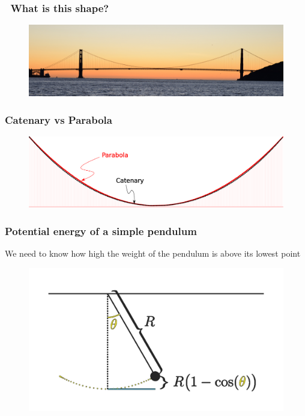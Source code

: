 \documentclass[notes]{beamer}
\begin{document}
\begin{frame}
	\frametitle{\faQuestionCircleO ~What is this shape?}
	\begin{figure}[ht]
		\centering
		\includegraphics[width=\textwidth]{figs/parabola.jpg}
	\end{figure}
\end{frame}


\begin{frame}
	\frametitle{Catenary vs Parabola}
	\begin{figure}[ht]
		\centering
		\includegraphics[width=\textwidth]{figs/catenary_parabola.png}
	\end{figure}
\end{frame}


\begin{frame}
	\frametitle{Potential energy of a simple pendulum}
	We need to know how high the weight of the pendulum is above its lowest point
	\begin{figure}[ht]
		\centering
		\includegraphics[width=\textwidth]{figs/simple-pendulum.png}
	\end{figure}
\end{frame}
\end{document}
